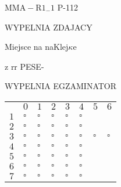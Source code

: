 \documentclass[a4paper,12pt]{article}
\begin{document}
$\mathrm{M}\mathrm{M}\mathrm{A}-\mathrm{R}1_{-}1$ P-112

WYPELNIA ZDAJACY

Miejsce na naKlej$\kappa$e

z rr PESE-

WYPELNIA EGZAMINATOR
\begin{center}
\begin{tabular}{|l|l|l|l|l|l|l|l|}
	\\
&	\multicolumn{1}{|l|}{$0$}&	\multicolumn{1}{|l|}{ $1$}&	\multicolumn{1}{|l|}{ $2$}&	\multicolumn{1}{|l|}{ $3$}&	\multicolumn{1}{|l|}{ $4$}&	\multicolumn{1}{|l|}{ $5$}&	\multicolumn{1}{|l|}{ $6$}	\\
\cline{2-8}
\multicolumn{1}{|l|}{ $1$}&	\multicolumn{1}{|l|}{ $\square $}&	\multicolumn{1}{|l|}{ $\square $}&	\multicolumn{1}{|l|}{ $\square $}&	\multicolumn{1}{|l|}{ $\square $}&	\multicolumn{1}{|l|}{ $\square $}&	\multicolumn{1}{|l|}{}&	\multicolumn{1}{|l|}{}	\\
\hline
\multicolumn{1}{|l|}{ $2$}&	\multicolumn{1}{|l|}{ $\square $}&	\multicolumn{1}{|l|}{ $\square $}&	\multicolumn{1}{|l|}{ $\square $}&	\multicolumn{1}{|l|}{ $\square $}&	\multicolumn{1}{|l|}{ $\square $}&	\multicolumn{1}{|l|}{}&	\multicolumn{1}{|l|}{}	\\
\hline
\multicolumn{1}{|l|}{ $3$}&	\multicolumn{1}{|l|}{ $\square $}&	\multicolumn{1}{|l|}{ $\square $}&	\multicolumn{1}{|l|}{ $\square $}&	\multicolumn{1}{|l|}{ $\square $}&	\multicolumn{1}{|l|}{ $\square $}&	\multicolumn{1}{|l|}{ $\square $}&	\multicolumn{1}{|l|}{ $\square $}	\\
\hline
\multicolumn{1}{|l|}{ $4$}&	\multicolumn{1}{|l|}{ $\square $}&	\multicolumn{1}{|l|}{ $\square $}&	\multicolumn{1}{|l|}{ $\square $}&	\multicolumn{1}{|l|}{ $\square $}&	\multicolumn{1}{|l|}{ $\square $}&	\multicolumn{1}{|l|}{}&	\multicolumn{1}{|l|}{}	\\
\hline
\multicolumn{1}{|l|}{ $5$}&	\multicolumn{1}{|l|}{ $\square $}&	\multicolumn{1}{|l|}{ $\square $}&	\multicolumn{1}{|l|}{ $\square $}&	\multicolumn{1}{|l|}{ $\square $}&	\multicolumn{1}{|l|}{ $\square $}&	\multicolumn{1}{|l|}{}&	\multicolumn{1}{|l|}{}	\\
\hline
\multicolumn{1}{|l|}{ $6$}&	\multicolumn{1}{|l|}{ $\square $}&	\multicolumn{1}{|l|}{ $\square $}&	\multicolumn{1}{|l|}{ $\square $}&	\multicolumn{1}{|l|}{ $\square $}&	\multicolumn{1}{|l|}{ $\square $}&	\multicolumn{1}{|l|}{}&	\multicolumn{1}{|l|}{}	\\
\hline
\multicolumn{1}{|l|}{ $7$}&	\multicolumn{1}{|l|}{ $\square $}&	\multicolumn{1}{|l|}{ $\square $}&	\multicolumn{1}{|l|}{ $\square $}&	\multicolumn{1}{|l|}{ $\square $}&	\multicolumn{1}{|l|}{ $\square $}&	\multicolumn{1}{|l|}{}&	\multicolumn{1}{|l|}{}	\\

\end{tabular}
\end{center}
\end{document}
